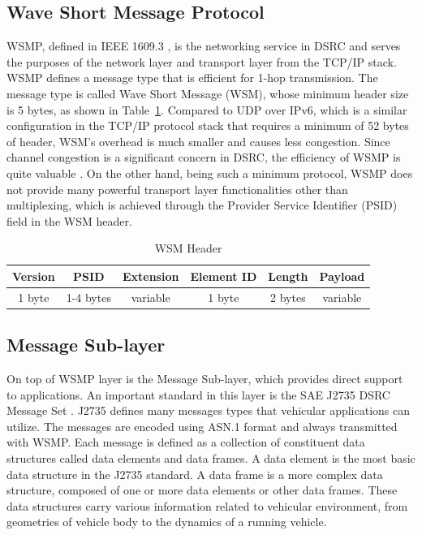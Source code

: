 \documentclass[12pt]{report}
\begin{document}
\subsection{Wave Short Message Protocol}
WSMP, defined in IEEE 1609.3 \cite{ieee16093}, is the networking service in DSRC and serves the purposes of the network layer and transport layer from the TCP/IP stack. WSMP defines a message type that is efficient for 1-hop transmission. The message type is called Wave Short Message (WSM), whose minimum header size is 5 bytes, as shown in Table~\ref{tab:wsm}. Compared to UDP over IPv6, which is a similar configuration in the TCP/IP protocol stack that requires a minimum of 52 bytes of header, WSM's overhead is much smaller and causes less congestion. Since channel congestion is a significant concern in DSRC, the efficiency of WSMP is quite valuable \cite{kenney2011}. On the other hand, being such a minimum protocol, WSMP does not provide many powerful transport layer functionalities other than multiplexing, which is achieved through the Provider Service Identifier (PSID) field in the WSM header.

\begin{table}[h]
  \begin{center}
    \begin{tabular}{|c|c|c|c|c|c|}
      \hline
      Version & PSID      & Extension   & Element ID & Length  & Payload \\ \hline
      1 byte  & 1-4 bytes & variable    & 1 byte     & 2 bytes & variable \\ \hline
    \end{tabular}
    \caption{\label{tab:wsm}WSM Header}
  \end{center}
\end{table}

\subsection{Message Sub-layer}
On top of WSMP layer is the Message Sub-layer, which provides direct support to applications. An important standard in this layer is the SAE J2735 DSRC Message Set \cite{sae2016j2735}. J2735 defines many messages types that vehicular applications can utilize. The messages are encoded using ASN.1 format and always transmitted with WSMP. Each message is defined as a collection of constituent data structures called data elements and data frames. A data element is the most basic data structure in the J2735 standard. A data frame is a more complex data structure, composed of one or more data elements or other data frames. \cite{kenney2011} These data structures carry various information related to vehicular environment, from geometries of vehicle body to the dynamics of a running vehicle.
\end{document}
